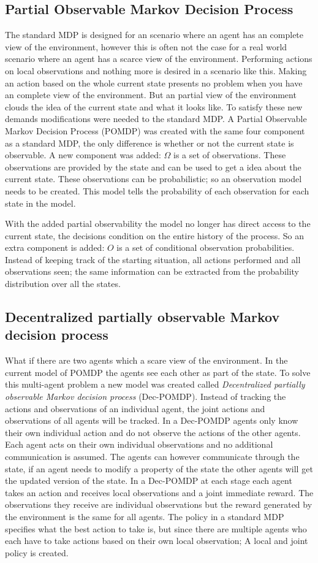 \subsection{Partial Observable Markov Decision Process}
The standard MDP is designed for an scenario where an agent has an complete view of the environment, however this is often not the case for a real world scenario where an agent has a scarce view of the environment. Performing actions on local observations and nothing more is desired in a scenario like this. Making an action based on the whole current state presents no problem when you have an complete view of the environment. But an partial view of the environment clouds the idea of the current state and what it looks like. To satisfy these new demands modifications were needed to the standard MDP. A Partial Observable Markov Decision Process (POMDP) was created with the same four component as a standard MDP, the only difference is whether or not the current state is observable. A new component was added:  ${\displaystyle \Omega}$ is a set of observations. These observations are provided by the state and can be used to get a idea about the current state. These observations can be probabilistic; so an observation model needs to be created. This model tells the probability of each observation for each state in the model.
\par
With the added partial observability the model no longer has direct access to the current state, the decisions condition on the entire history of the process. So an extra component is added: ${\displaystyle O}$ is a set of conditional observation probabilities. Instead of keeping track of the starting situation, all actions performed and all observations seen; the same information can be extracted from the probability distribution over all the states. 
\subsection{Decentralized partially observable Markov decision process}
What if there are two agents which a scare view of the environment. In the current model of POMDP the agents see each other as part of the state. To solve this multi-agent problem a new model was created called \textit{Decentralized partially observable Markov decision process} (Dec-POMDP). Instead of tracking the actions and observations of an individual agent, the joint actions and observations of all agents will be tracked. In a Dec-POMDP agents only know their own individual action and do not observe the actions of the other agents. Each agent acts on their own individual observations and no additional communication is assumed. The agents can however communicate through the state, if an agent needs to modify a property of the state the other agents will get the updated version of the state. In a Dec-POMDP at each stage each agent takes an action and receives local observations and a joint immediate reward. The observations they receive are individual observations but the reward generated by the environment is the same for all agents. The policy in a standard MDP specifies what the best action to take is, but since there are multiple agents who each have to take actions based on their own local observation; A local and joint policy is created.
